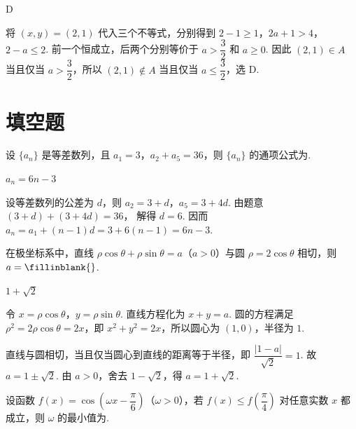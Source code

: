 \begin{answer}
D
\end{answer}

\begin{solution}
将 \((x,y)=(2,1)\) 代入三个不等式，分别得到
\(2-1\geq1\)，\(2a+1>4\)，\(2-a\leq2\).
前一个恒成立，后两个分别等价于 \(a>\dfrac32\) 和 \(a\geq0\). 因此
\((2,1)\in A\) 当且仅当 \(a>\dfrac32\)，所以 \((2,1)\notin A\) 当且仅当 \(a\leq\dfrac32\)，选 D.
\end{solution}

\section{填空题}

\begin{problem}
设 \(\{a_n\}\) 是等差数列，且 \(a_1=3\)，\(a_2+a_5=36\)，则 \(\{a_n\}\) 的通项公式为\fillinblank{}.
\end{problem}

\begin{answer}
\(a_n=6n-3\)
\end{answer}

\begin{solution}
设等差数列的公差为 \(d\)，则 \(a_2=3+d\)，\(a_5=3+4d\). 由题意 \((3+d)+(3+4d)=36\)，
解得 \(d=6\). 因而
\(a_n=a_1+(n-1)d=3+6(n-1)=6n-3\).
\end{solution}

\begin{problem}
在极坐标系中，直线 \(\rho\cos\theta+\rho\sin\theta=a\)（\(a>0\)）与圆 \(\rho=2\cos\theta\) 相切，则 \(a=\fillinblank{}\).
\end{problem}

\begin{answer}
\(1+\sqrt2\)
\end{answer}

\begin{solution}
令 \(x=\rho\cos\theta\)，\(y=\rho\sin\theta\). 直线方程化为 \(x+y=a\). 圆的方程满足
\(\rho^2=2\rho\cos\theta=2x\)，即 \(x^2+y^2=2x\)，所以圆心为 \((1,0)\)，半径为 \(1\).

直线与圆相切，当且仅当圆心到直线的距离等于半径，即
\(\dfrac{|1-a|}{\sqrt2}=1\).
故 \(a=1\pm\sqrt2\). 由 \(a>0\)，舍去 \(1-\sqrt2\)，得 \(a=1+\sqrt2\).
\end{solution}

\begin{problem}
设函数 \(f(x)=\cos\!\left(\omega x-\dfrac{\pi}{6}\right)\)（\(\omega>0\)），若 \(f(x)\le f\!\left(\dfrac{\pi}{4}\right)\) 对任意实数 \(x\) 都成立，则 \(\omega\) 的最小值为\fillinblank{}.
\end{problem}

